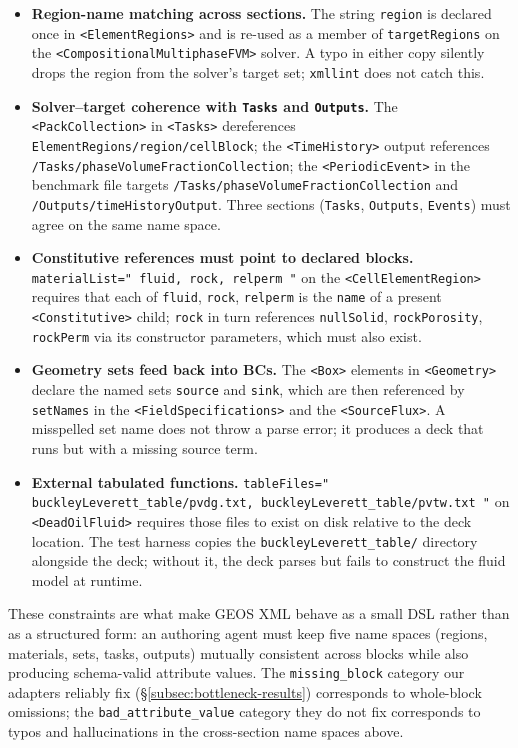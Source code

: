 \documentclass{article}
\begin{document}
\begin{itemize}
\item \textbf{Region-name matching across sections.} The string \texttt{region} is declared once in \texttt{<ElementRegions>} and is re-used as a member of \texttt{targetRegions} on the \texttt{<CompositionalMultiphaseFVM>} solver. A typo in either copy silently drops the region from the solver's target set; \texttt{xmllint} does not catch this.
\item \textbf{Solver--target coherence with \texttt{Tasks} and \texttt{Outputs}.} The \texttt{<PackCollection>} in \texttt{<Tasks>} dereferences \texttt{ElementRegions/region/cellBlock}; the \texttt{<TimeHistory>} output references \texttt{/Tasks/phaseVolumeFractionCollection}; the \texttt{<PeriodicEvent>} in the benchmark file targets \texttt{/Tasks/phaseVolumeFractionCollection} and \texttt{/Outputs/timeHistoryOutput}. Three sections (\texttt{Tasks}, \texttt{Outputs}, \texttt{Events}) must agree on the same name space.
\item \textbf{Constitutive references must point to declared blocks.} \texttt{materialList="{ fluid, rock, relperm }"} on the \texttt{<CellElementRegion>} requires that each of \texttt{fluid}, \texttt{rock}, \texttt{relperm} is the \texttt{name} of a present \texttt{<Constitutive>} child; \texttt{rock} in turn references \texttt{nullSolid}, \texttt{rockPorosity}, \texttt{rockPerm} via its constructor parameters, which must also exist.
\item \textbf{Geometry sets feed back into BCs.} The \texttt{<Box>} elements in \texttt{<Geometry>} declare the named sets \texttt{source} and \texttt{sink}, which are then referenced by \texttt{setNames} in the \texttt{<FieldSpecifications>} and the \texttt{<SourceFlux>}. A misspelled set name does not throw a parse error; it produces a deck that runs but with a missing source term.
\item \textbf{External tabulated functions.} \texttt{tableFiles="{ buckleyLeverett\_table/pvdg.txt, buckleyLeverett\_table/pvtw.txt }"} on \texttt{<DeadOilFluid>} requires those files to exist on disk relative to the deck location. The test harness copies the \texttt{buckleyLeverett\_table/} directory alongside the deck; without it, the deck parses but fails to construct the fluid model at runtime.
\end{itemize}

These constraints are what make GEOS XML behave as a small DSL rather than as a structured form: an authoring agent must keep five name spaces (regions, materials, sets, tasks, outputs) mutually consistent across blocks while also producing schema-valid attribute values. The \texttt{missing\_block} category our adapters reliably fix (\S\ref{subsec:bottleneck-results}) corresponds to whole-block omissions; the \texttt{bad\_attribute\_value} category they do not fix corresponds to typos and hallucinations in the cross-section name spaces above.
\end{document}
